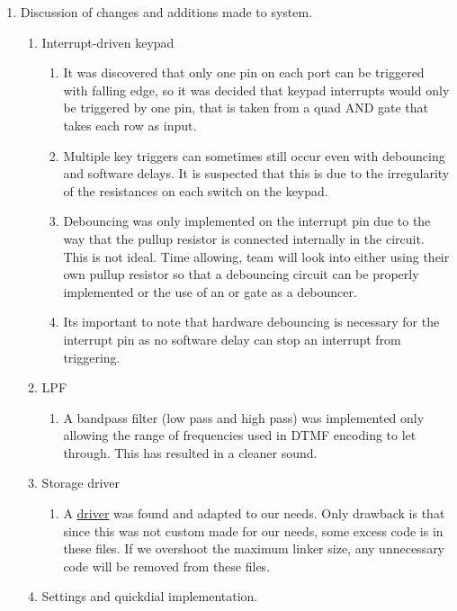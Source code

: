 \documentclass[11pt,a4paper]{scrartcl}
\begin{document}
\begin{enumerate}
\item Discussion of changes and additions made to system.
    \begin{enumerate}
        \item Interrupt-driven keypad
        \begin{enumerate}
            \item It was discovered that only one pin on each port can be triggered with falling edge, so it was decided that keypad interrupts would only be triggered by one pin, that is taken from a quad AND gate that takes each row as input.
            \item Multiple key triggers can sometimes still occur even with debouncing and software delays. It is suspected that this is due to the irregularity of the resistances on each switch on the keypad.
            \item Debouncing was only implemented on the interrupt pin due to the way that the pullup resistor is connected internally in the circuit. This is not ideal. Time allowing, team will look into either using their own pullup resistor so that a debouncing circuit can be properly implemented or the use of an or gate as a debouncer.
            \item Its important to note that hardware debouncing is necessary for the interrupt pin as no software delay can stop an interrupt from triggering.
        \end{enumerate}
        \item LPF
        \begin{enumerate}
            \item A bandpass filter (low pass and high pass) was implemented only allowing the range of frequencies used in DTMF encoding to let through. This has resulted in a cleaner sound.
        \end{enumerate}
        \item Storage driver
        \begin{enumerate}
            \item A \href{https://github.com/RT-Thread/realboard-lpc4088/tree/master/software/lpcware_lpc408x/Drivers}{driver} was found and adapted to our needs. Only drawback is that since this was not custom made for our needs, some excess code is in these files. If we overshoot the maximum linker size, any unnecessary code will be removed from these files.
        \end{enumerate}
        \item Settings and quickdial implementation.

\end{enumerate}
\end{enumerate}
\end{document}
